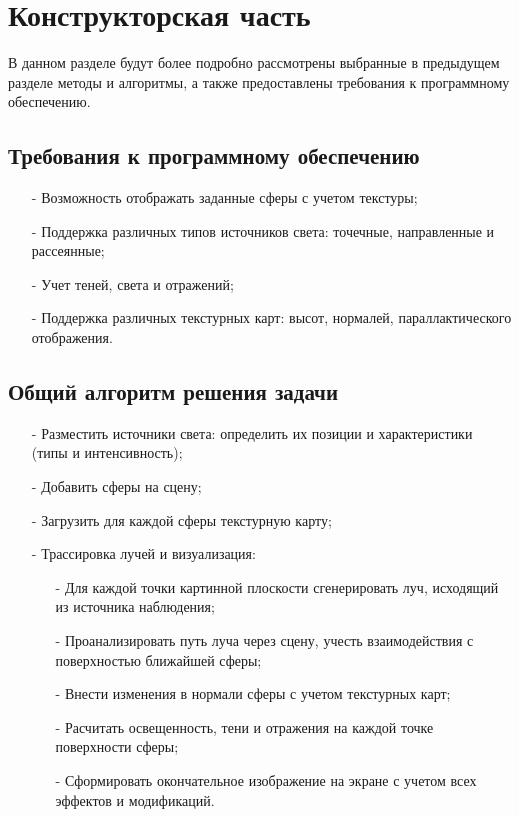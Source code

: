 \chapter{Конструкторская часть}

В данном разделе будут более подробно рассмотрены выбранные в предыдущем разделе методы и алгоритмы, а также предоставлены требования к программному обеспечению.

\section{Требования к программному обеспечению}
\begin{itemize}[label=\arabic*)]
	\item[-] Возможность отображать заданные сферы с учетом текстуры;
	\item[-] Поддержка различных типов источников света: точечные, направленные и рассеянные;
	\item[-] Учет теней, света и отражений;
	\item[-] Поддержка различных текстурных карт: высот, нормалей, параллактического отображения.
\end{itemize}

\section{Общий алгоритм решения задачи}
\begin{itemize}[label=\arabic*)]
	\item[-] Разместить источники света: определить их позиции и характеристики (типы и интенсивность);
	\item[-] Добавить сферы на сцену;
	\item[-] Загрузить для каждой сферы текстурную карту;
	\item[-] Трассировка лучей и визуализация:
	\begin{itemize}[label=\arabic*)]
		\item[-] Для каждой точки картинной плоскости сгенерировать луч, исходящий из источника наблюдения;
		\item[-] Проанализировать путь луча через сцену, учесть взаимодействия с поверхностью ближайшей сферы;
		\item[-] Внести изменения в нормали сферы с учетом текстурных карт;
		\item[-] Расчитать освещенность, тени и отражения на каждой точке поверхности сферы;
		\item[-] Сформировать окончательное изображение на экране с учетом всех эффектов и модификаций.
	\end{itemize}
\end{itemize}

